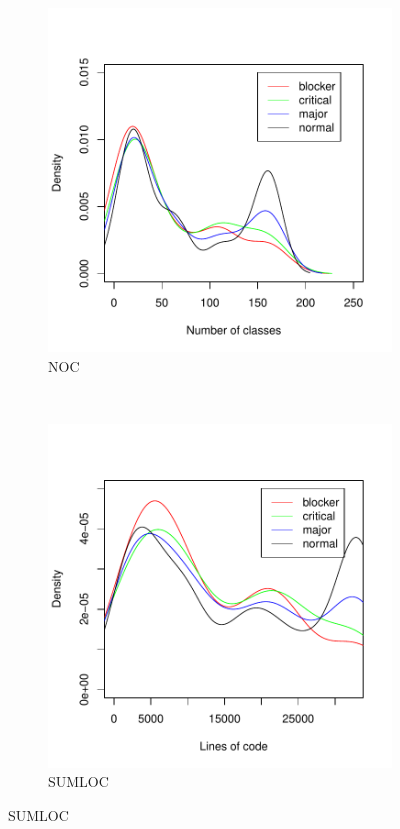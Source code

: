 \begin{figure}
        \begin{subfigure}[b]{0.5\textwidth}
                \centering
                \includegraphics[width=\textwidth]{img/sev-core-noc-density.pdf}
                \caption{NOC}
                \label{fig:density-sevcore-noc}
        \end{subfigure}%
        ~ %
        \begin{subfigure}[b]{0.5\textwidth}
                \centering
                \includegraphics[width=\textwidth]{img/sev-core-sumloc-density.pdf}
                \caption{SUMLOC}
                \label{fig:density-sevcore-sumloc}
        \end{subfigure}


\end{figure}
